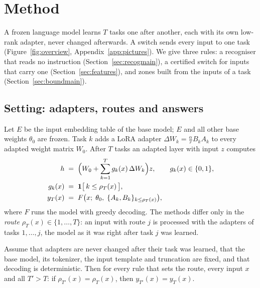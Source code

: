 \section{Method}
\label{sec:method}

A frozen language model learns $T$ tasks one after another, each with its own low-rank adapter, never
changed afterwards. A switch sends every input to one task (Figure~\ref{fig:overview}, Appendix~\ref{app:pictures}). We give three rules: a recogniser that
reads no instruction (Section~\ref{sec:recogmain}), a certified switch for inputs that carry one
(Section~\ref{sec:features}), and zones built from the inputs of a task (Section~\ref{sec:boundmain}).

\subsection{Setting: adapters, routes and answers}
\label{sec:setting}

Let $E$ be the input embedding table of the base model; $E$ and all other base weights $\theta_0$ are
frozen. Task $k$ adds a LoRA adapter \citep{hu2022lora} $\Delta W_k = \tfrac{\alpha}{r} B_k A_k$ to
every adapted weight matrix $W_0$. After $T$ tasks an adapted layer with input $z$ computes
\begin{align}
  h &\;=\; \Bigl( W_0 + \sum_{k=1}^{T} g_k(x)\, \Delta W_k \Bigr) z , \qquad g_k(x) \in \{0, 1\},
  \label{eq:layer}\\
  g_k(x) &\;=\; \mathbf{1}\bigl[\, k \le \rho_T(x) \,\bigr] , \label{eq:gates}\\
  y_T(x) &\;=\; F\bigl(x;\; \theta_0,\; \{A_k, B_k\}_{k \le \rho_T(x)}\bigr),
  \label{eq:answer}
\end{align}
where $F$ runs the model with greedy decoding. The methods differ only in the \emph{route}
$\rho_T(x) \in \{1, \dots, T\}$: an input with route $j$ is processed with the adapters of tasks
$1, \dots, j$, the model as it was right after task $j$ was learned.

\begin{lemma}
\label{lem:route}
Assume that adapters are never changed after their task was learned, that the base model, its
tokenizer, the input template and truncation are fixed, and that decoding is deterministic. Then for
every rule that sets the route, every input $x$ and all $T' > T$: if $\rho_{T'}(x) = \rho_T(x)$, then
$y_{T'}(x) = y_T(x)$.
\end{lemma}

